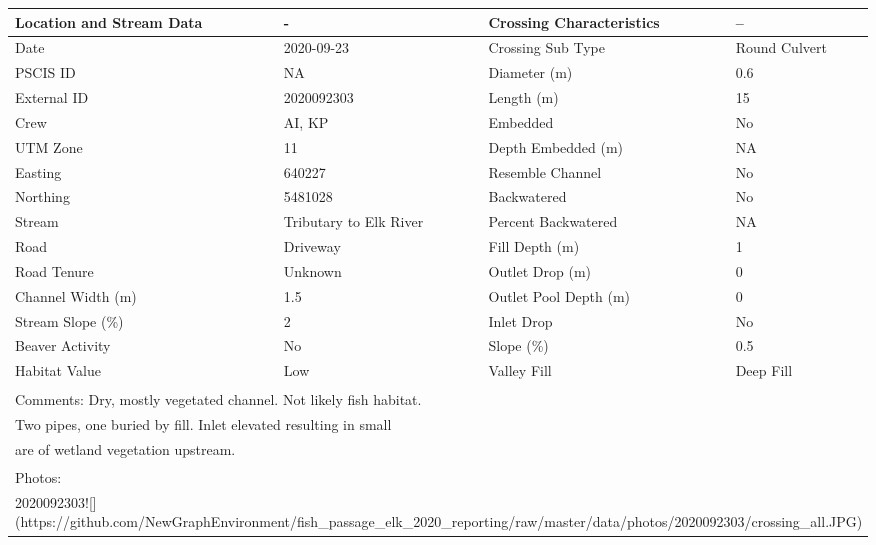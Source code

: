 \documentclass[
]{book}
\begin{document}
\begin{tabular}{l|l|l|l}
\hline
Location and Stream Data & - & Crossing Characteristics & --\\
\hline
Date & 2020-09-23 & Crossing Sub Type & Round Culvert\\
\hline
PSCIS ID & NA & Diameter (m) & 0.6\\
\hline
External ID & 2020092303 & Length (m) & 15\\
\hline
Crew & AI, KP & Embedded & No\\
\hline
UTM Zone & 11 & Depth Embedded (m) & NA\\
\hline
Easting & 640227 & Resemble Channel & No\\
\hline
Northing & 5481028 & Backwatered & No\\
\hline
Stream & Tributary to Elk River & Percent Backwatered & NA\\
\hline
Road & Driveway & Fill Depth (m) & 1\\
\hline
Road Tenure & Unknown & Outlet Drop (m) & 0\\
\hline
Channel Width (m) & 1.5 & Outlet Pool Depth (m) & 0\\
\hline
Stream Slope (\%) & 2 & Inlet Drop & No\\
\hline
Beaver Activity & No & Slope (\%) & 0.5\\
\hline
Habitat Value & Low & Valley Fill & Deep Fill\\
\hline
\multicolumn{4}{l}{\textsuperscript{} Comments: Dry, mostly vegetated channel. Not likely fish habitat.}\\
\multicolumn{4}{l}{Two pipes, one buried by fill. Inlet elevated resulting in small}\\
\multicolumn{4}{l}{are of wetland vegetation upstream.}\\
\multicolumn{4}{l}{\textsuperscript{} Photos:}\\
\multicolumn{4}{l}{2020092303![](https://github.com/NewGraphEnvironment/fish\_passage\_elk\_2020\_reporting/raw/master/data/photos/2020092303/crossing\_all.JPG)}\\
\end{tabular}
\end{document}
